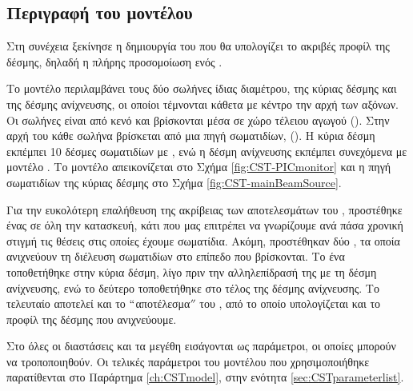 \subsection{Περιγραφή του μοντέλου}
Στη συνέχεια ξεκίνησε η δημιουργία του  που θα υπολογίζει το ακριβές προφίλ της δέσμης, δηλαδή η πλήρης προσομοίωση ενός .

Το μοντέλο περιλαμβάνει τους δύο σωλήνες ίδιας διαμέτρου, της κύριας δέσμης και της δέσμης ανίχνευσης, οι οποίοι τέμνονται κάθετα με κέντρο την αρχή των αξόνων. Οι σωλήνες είναι από κενό και βρίσκονται μέσα σε χώρο τέλειου αγωγού ().
Στην αρχή του κάθε σωλήνα βρίσκεται από μια πηγή σωματιδίων, (). 
Η κύρια δέσμη εκπέμπει 10 δέσμες σωματιδίων με , ενώ η δέσμη ανίχνευσης εκπέμπει συνεχόμενα με μοντέλο . 
Το μοντέλο απεικονίζεται στο Σχήμα \ref{fig:CST-PICmonitor} και η πηγή σωματιδίων της κύριας δέσμης στο Σχήμα \ref{fig:CST-mainBeamSource}.

Για την ευκολότερη επαλήθευση της ακρίβειας των αποτελεσμάτων του , προστέθηκε ένας  σε όλη την κατασκευή, κάτι που μας επιτρέπει να γνωρίζουμε ανά πάσα χρονική στιγμή τις θέσεις στις οποίες έχουμε σωματίδια.
Ακόμη, προστέθηκαν δύο , τα οποία ανιχνεύουν τη διέλευση σωματιδίων στο επίπεδο που βρίσκονται.
Το ένα τοποθετήθηκε στην κύρια δέσμη, λίγο πριν την αλληλεπίδρασή της με τη δέσμη ανίχνευσης, ενώ το δεύτερο τοποθετήθηκε στο τέλος της δέσμης ανίχνευσης.
Το τελευταίο αποτελεί και το $``$αποτέλεσμα$''$ του , από το οποίο υπολογίζεται και το προφίλ της δέσμης που ανιχνεύουμε.

Στο  όλες οι διαστάσεις και τα μεγέθη εισάγονται ως παράμετροι, οι οποίες μπορούν να τροποποιηθούν. Οι τελικές παράμετροι του μοντέλου που χρησιμοποιήθηκε παρατίθενται στο Παράρτημα \ref{ch:CSTmodel}, στην ενότητα \ref{sec:CSTparameterlist}.

